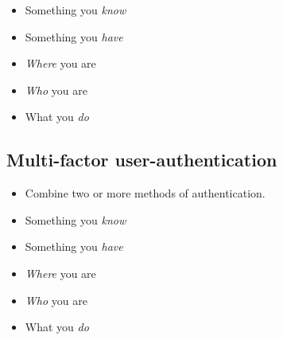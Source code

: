 \begin{frame}
  \begin{example}
    \begin{itemize}
      \item Something you \emph{know}

        \pause{}

      \item Something you \emph{have}

        \pause{}

      \item \emph{Where} you are

        \pause{}

      \item \emph{Who} you are
      \item What you \emph{do}
    \end{itemize}
  \end{example}
\end{frame}

\subsection{Multi-factor user-authentication}

\begin{frame}
  \begin{definition}
    \begin{itemize}
      \item Combine two or more methods of authentication.
    \end{itemize}
  \end{definition}

  \begin{example}
    \begin{itemize}
      \item Something you \emph{know}
      \item Something you \emph{have}
      \item \emph{Where} you are
      \item \emph{Who} you are
      \item What you \emph{do}
    \end{itemize}
  \end{example}
\end{frame}

